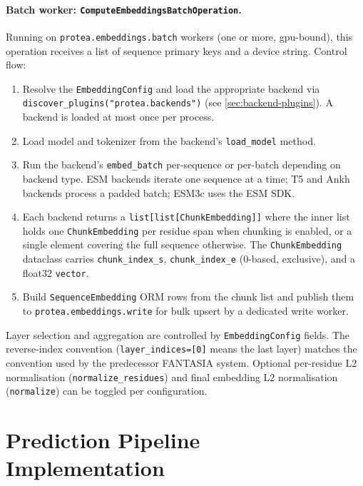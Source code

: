 \paragraph{Batch worker: \texttt{ComputeEmbeddingsBatchOperation}.}
Running on \texttt{protea.embeddings.batch} workers (one or more, \gls{gpu}-bound),
this operation receives a list of sequence primary keys and a device string.
Control flow:

\begin{enumerate}
  \item Resolve the \texttt{EmbeddingConfig} and load the appropriate backend
    via \texttt{discover\_plugins("protea.backends")} (see
    \cref{sec:backend-plugins}). A backend is loaded at most once per process.
  \item Load model and tokenizer from the backend's \texttt{load\_model} method.
  \item Run the backend's \texttt{embed\_batch} per-sequence or per-batch
    depending on backend type. ESM backends iterate one sequence at a time;
    T5 and Ankh backends process a padded batch; ESM3c uses the ESM SDK.
  \item Each backend returns a \texttt{list[list[ChunkEmbedding]]} where
    the inner list holds one \texttt{ChunkEmbedding} per residue span when
    chunking is enabled, or a single element covering the full sequence
    otherwise. The \texttt{ChunkEmbedding} dataclass carries
    \texttt{chunk\_index\_s}, \texttt{chunk\_index\_e} (0-based, exclusive),
    and a float32 \texttt{vector}.
  \item Build \texttt{SequenceEmbedding} ORM rows from the chunk list and
    publish them to \texttt{protea.embeddings.write} for bulk upsert by a
    dedicated write worker.
\end{enumerate}

Layer selection and aggregation are controlled by \texttt{EmbeddingConfig}
fields. The reverse-index convention (\texttt{layer\_indices=[0]} means the
last layer) matches the convention used by the predecessor FANTASIA system.
Optional per-residue L2 normalisation (\texttt{normalize\_residues}) and
final embedding L2 normalisation (\texttt{normalize}) can be toggled per
configuration.

\section{Prediction Pipeline Implementation}
\label{sec:impl-prediction-pipeline}

